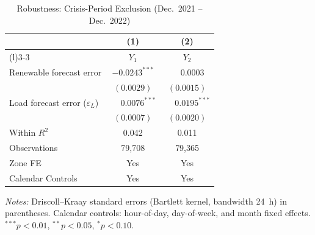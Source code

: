 \documentclass{article}
\begin{document}
\begin{table}[htbp]
\centering
\caption{Robustness: Crisis-Period Exclusion (Dec.~2021 -- Dec.~2022)}
\label{tab:r1_crisis}
\begin{threeparttable}
\begin{tabularx}{\linewidth}{>{\raggedright\arraybackslash}Xcc}
\toprule
 & (1) & (2) \\
\cmidrule(r){2-2}\cmidrule(l){3-3}
 & $Y_1$ & $Y_2$ \\
\midrule
Renewable forecast error & $-0.0243^{***}$ & $\phantom{-}0.0003$ \\
 & $(0.0029)$ & $(0.0015)$ \\[0.4ex]
Load forecast error ($\varepsilon_L$) & $\phantom{-}0.0076^{***}$ & $\phantom{-}0.0195^{***}$ \\
 & $(0.0007)$ & $(0.0020)$ \\
\midrule
Within $R^2$ & 0.042 & 0.011 \\
Observations & 79,708 & 79,365 \\
Zone FE & Yes & Yes \\
Calendar Controls & Yes & Yes \\
\bottomrule
\end{tabularx}
\begin{tablenotes}[flushleft]
\footnotesize
\item \textit{Notes:} Driscoll--Kraay standard errors (Bartlett kernel, bandwidth 24~h) in parentheses. Calendar controls: hour-of-day, day-of-week, and month fixed effects. $^{***}p<0.01$, $^{**}p<0.05$, $^{*}p<0.10$.
\end{tablenotes}
\end{threeparttable}
\end{table}
\end{document}
